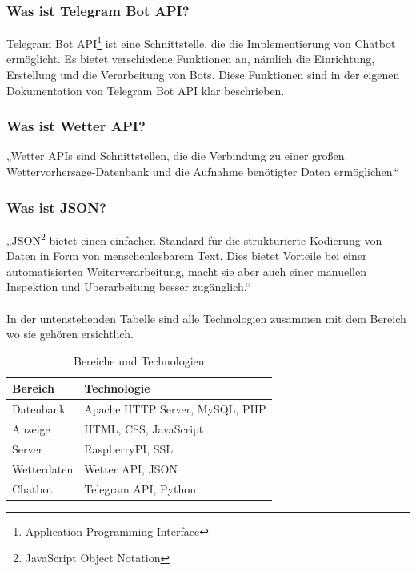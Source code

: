 \subsubsection{Was ist Telegram Bot API?} 
Telegram Bot API\footnote{Application Programming Interface} ist eine Schnittstelle, die die Implementierung von Chatbot ermöglicht. Es bietet verschiedene Funktionen an, nämlich die Einrichtung, Erstellung und die Verarbeitung von Bots. Diese Funktionen sind in der eigenen Dokumentation von Telegram Bot API klar beschrieben. \cite{50_telegram}  
\subsubsection{Was ist Wetter API?} 
„Wetter APIs sind Schnittstellen, die die Verbindung zu einer großen Wettervorhersage-Datenbank und die Aufnahme benötigter Daten ermöglichen.“ \cite{50_Wetter}
\subsubsection{Was ist JSON?} 
„JSON\footnote{JavaScript Object Notation} bietet einen einfachen Standard für die strukturierte Kodierung von Daten in Form von menschenlesbarem Text. Dies bietet Vorteile bei einer automatisierten Weiterverarbeitung, macht sie aber auch einer manuellen Inspektion und Überarbeitung besser zugänglich.“ \\ \cite{50_json}
\\
In der untenstehenden Tabelle sind alle Technologien zusammen mit dem Bereich wo sie gehören ersichtlich. 
\begin{table}[h]
	\begin{center}
		
		\label{tab:Tabelle1}
	
			\begin{tabular}{ | l |l |} 
				\hline
				\textbf{Bereich} & \textbf{Technologie}\\ \hline 
				Datenbank &	Apache HTTP Server, MySQL, PHP \\ \hline
				Anzeige &	HTML, CSS, JavaScript \\ \hline
				Server &	RaspberryPI, SSL \\ \hline
				Wetterdaten	 &Wetter API, JSON \\ \hline
				Chatbot &	Telegram API, Python \\ \hline
				
				\hline
				 
		
		\end{tabular} 
		\caption{Bereiche und Technologien}
	\end{center}
\end{table} 

